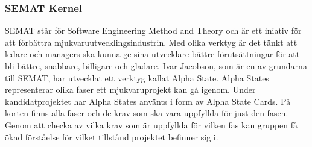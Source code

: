 \subsubsection{SEMAT Kernel}
SEMAT står för Software Engineering Method and Theory och är ett iniativ för att förbättra mjukvaruutvecklingsindustrin. Med olika verktyg är det tänkt att ledare och managers ska kunna ge sina utvecklare bättre förutsättningar för att bli bättre, snabbare, billigare och gladare. \citep{semat} 
\newline
\newline
Ivar Jacobson, som är en av grundarna till SEMAT, har utvecklat ett verktyg kallat Alpha State. Alpha States representerar olika faser ett mjukvaruprojekt kan gå igenom.
\newline
\newline 
Under kandidatprojektet har Alpha States använts i form av Alpha State Cards. På korten finns alla faser och de krav som ska vara uppfyllda för just den fasen. Genom att checka av vilka krav som är uppfyllda för vilken fas kan gruppen få ökad förståelse för vilket tillstånd projektet befinner sig i.  

